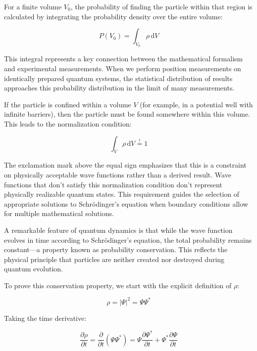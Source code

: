 \documentclass[italian]{HKNdocument}
\begin{document}
For a finite volume $V_{0}$, the probability of finding the particle within that region is calculated by integrating the probability density over the entire volume:

\begin{equation}
P\left(V_{0}\right)=\int_{V_{0}} \rho \, \mathrm{d} V
\end{equation}

This integral represents a key connection between the mathematical formalism and experimental measurements. When we perform position measurements on identically prepared quantum systems, the statistical distribution of results approaches this probability distribution in the limit of many measurements.

If the particle is confined within a volume $V$ (for example, in a potential well with infinite barriers), then the particle must be found somewhere within this volume. This leads to the normalization condition:

\begin{equation}
\int_{V} \rho \, \mathrm{d} V \stackrel{!}{=} 1
\end{equation}

The exclamation mark above the equal sign emphasizes that this is a constraint on physically acceptable wave functions rather than a derived result. Wave functions that don't satisfy this normalization condition don't represent physically realizable quantum states. This requirement guides the selection of appropriate solutions to Schrödinger's equation when boundary conditions allow for multiple mathematical solutions.

A remarkable feature of quantum dynamics is that while the wave function evolves in time according to Schrödinger's equation, the total probability remains constant—a property known as probability conservation. This reflects the physical principle that particles are neither created nor destroyed during quantum evolution.

To prove this conservation property, we start with the explicit definition of $\rho$:

\begin{equation}
\rho=|\Psi|^{2}=\Psi \Psi^{*}
\end{equation}

Taking the time derivative:

\begin{equation}
\frac{\partial \rho}{\partial t}=\frac{\partial}{\partial t}(\Psi \Psi^{*})=\Psi \frac{\partial \Psi^{*}}{\partial t}+\Psi^{*} \frac{\partial \Psi}{\partial t} \label{eq:1.28}
\end{equation}
\end{document}

